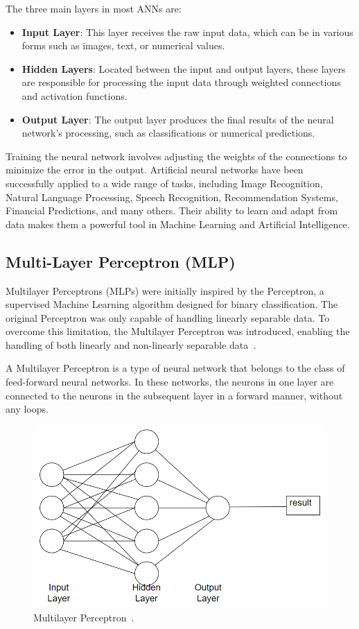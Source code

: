 \documentclass[12pt,a4paper]{report}
\begin{document}
The three main layers in most ANNs are:

\begin{itemize}
  \item \textbf{Input Layer}: This layer receives the raw input data, which can be in various forms such as images, text, or numerical values.
  \item \textbf{Hidden Layers}: Located between the input and output layers, these layers are responsible for processing the input data through weighted connections and activation functions.
  \item \textbf{Output Layer}: The output layer produces the final results of the neural network’s processing, such as classifications or numerical predictions.
\end{itemize}

Training the neural network involves adjusting the weights of the connections to minimize the error in the output. Artificial neural networks have been successfully applied to a wide range of tasks, including Image Recognition, Natural Language Processing, Speech Recognition, Recommendation Systems, Financial Predictions, and many others. Their ability to learn and adapt from data makes them a powerful tool in Machine Learning and Artificial Intelligence.

\subsection{Multi-Layer Perceptron (MLP)}
Multilayer Perceptrons (MLPs) were initially inspired by the Perceptron, a supervised Machine Learning algorithm designed for binary classification. The original Perceptron was only capable of handling linearly separable data. To overcome this limitation, the Multilayer Perceptron was introduced, enabling the handling of both linearly and non-linearly separable data~\cite{mlp}.

A Multilayer Perceptron is a type of neural network that belongs to the class of feed-forward neural networks. In these networks, the neurons in one layer are connected to the neurons in the subsequent layer in a forward manner, without any loops.

\begin{figure}[th]
  \centering
  \includegraphics[scale=0.65]{./pics/mlp.png}
  \caption[Multilayer Perceptron]{Multilayer Perceptron~\cite{mlp}.}
  \label{fig:pi5}
\end{figure}
\end{document}
